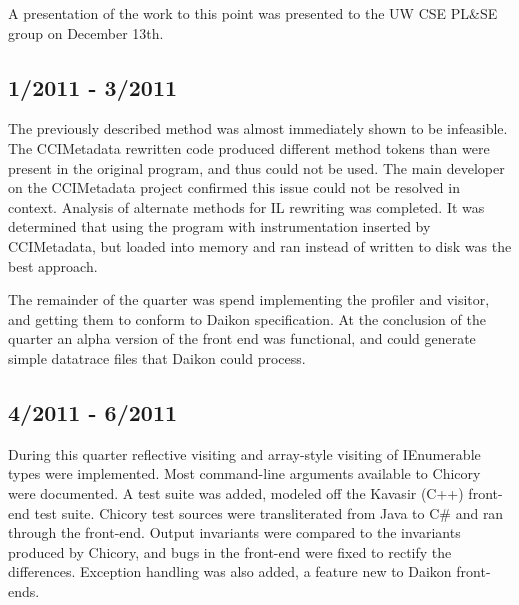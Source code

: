 \documentclass{article}
\begin{document}
A presentation of the work to this point was presented to the UW CSE PL\&SE group on December 13th.
\subsection{1/2011 - 3/2011}
The previously described method was almost immediately shown to be infeasible. The CCIMetadata rewritten code produced different method tokens than were present in the original program, and thus could not be used. The main developer on the CCIMetadata project confirmed this issue could not be resolved in context. Analysis of alternate methods for IL rewriting was completed. It was determined that using the program with instrumentation inserted by CCIMetadata, but loaded into memory and ran instead of written to disk was the best approach.

The remainder of the quarter was spend implementing the profiler and visitor, and getting them to conform to Daikon specification. At the conclusion of the quarter an alpha version of the front end was functional, and could generate simple datatrace files that Daikon could process.

\subsection{4/2011 - 6/2011}
During this quarter reflective visiting and array-style visiting of IEnumerable types were implemented. Most command-line arguments available to Chicory were documented. A test suite was added, modeled off the Kavasir (C++) front-end test suite. Chicory test sources were transliterated from Java to C\# and ran through the front-end. Output invariants were compared to the invariants produced by Chicory, and bugs in the front-end were fixed to rectify the differences. Exception handling was also added, a feature new to Daikon front-ends.
\end{document}

